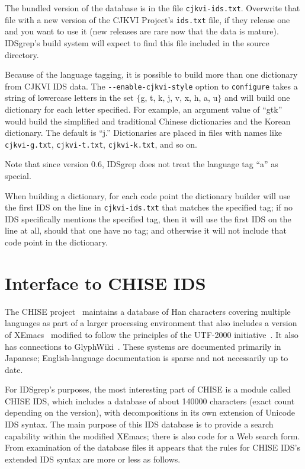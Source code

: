 \documentclass[twocolumn]{report}
\begin{document}
The bundled version of the database is in the file \texttt{cjkvi-ids.txt}. 
Overwrite that file with a new version of the CJKVI Project's
\texttt{ids.txt} file, if they release one and you want to use it (new
releases are rare now that the data is mature).  IDSgrep's build system will
expect to find this file included in the source directory.

Because of the language tagging, it is possible to build more than one
dictionary from CJKVI IDS data.  The \texttt{-{}-enable-cjkvi-style} option
to \texttt{configure} takes a string of lowercase letters in the set $\{$g,
t, k, j, v, x, h, a, u$\}$ and will build one dictionary for each letter
specified.  For example, an argument value of ``gtk'' would build the
simplified and traditional Chinese dictionaries and the Korean dictionary. 
The default is ``j.'' Dictionaries are placed in files with names like
\texttt{cjkvi-g.txt}, \texttt{cjkvi-t.txt}, \texttt{cjkvi-k.txt}, and so on. 

Note that since version 0.6, IDSgrep does not treat
the language tag ``a'' as special.

When building a dictionary, for each code point the
dictionary builder will use the first IDS on the line in
\texttt{cjkvi-ids.txt} that matches the specified tag; if no IDS
specifically mentions the specified tag, then it will use the first IDS on
the line at all, should that one have no tag; and otherwise it will not
include that code point in the dictionary.


\section{Interface to CHISE IDS}

The CHISE project~\cite{CHISE} maintains a database of Han characters
covering multiple languages as part of a larger processing environment that
also includes a version of XEmacs~\cite{XEmacs} modified to follow the
principles of the UTF-2000 initiative~\cite{UTF2000}.  It also has
connections to GlyphWiki~\cite{GlyphWiki}. 
These systems are documented primarily in Japanese; English-language
documentation is sparse and not necessarily up to date.

For IDSgrep's purposes, the most interesting part of CHISE is a module
called CHISE IDS, which includes a database of about 140000 characters
(exact count depending on the version), with decompositions in its own
extension of Unicode IDS syntax.  The main purpose of this IDS database is
to provide a search capability within the modified XEmacs; there is also
code for a Web search form.  From examination of the database files it
appears that the rules for CHISE IDS's extended IDS syntax are more or less
as follows.
\end{document}
